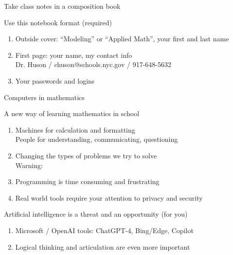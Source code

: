 \documentclass[onlytextwidth]{beamer}
\begin{document}
\begin{frame}{Take class notes in a composition book}
  \begin{block}{Use this notebook format (required)}
    \begin{enumerate}
      \item Outside cover: ``Modeling'' or ``Applied Math'', your first and last name
      \item First page: your name, my contact info \\
      \qquad Dr. Huson / chuson@schools.nyc.gov / 917-648-5632 \vspace{0.25cm}
      \item Your passwords and logins
    \end{enumerate}
    \end{block}
  \end{frame}
    
\begin{frame}{Computers in mathematics}
  \begin{block}{A new way of learning mathematics in school}
    \begin{enumerate}
      \item Machines for calculation and formatting \\
      People for understanding, communicating, questioning
      \item Changing the types of problems we try to solve \\[0.25cm]
      Warning:
      \item Programming is time consuming and frustrating
      \item Real world tools require your attention to privacy and security
    \end{enumerate}
    \end{block}
    \begin{block}{Artificial intelligence is a threat and an opportunity (for you)}
      \begin{enumerate}
        \item Microsoft / OpenAI tools: ChatGPT-4, Bing/Edge, Copilot
        \item Logical thinking and articulation are even more important
      \end{enumerate}
      \end{block}
  \end{frame}
\end{document}
